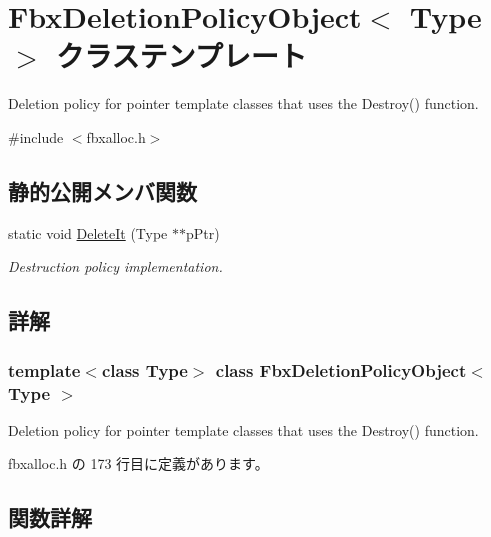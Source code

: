 \hypertarget{class_fbx_deletion_policy_object}{}\section{Fbx\+Deletion\+Policy\+Object$<$ Type $>$ クラステンプレート}
\label{class_fbx_deletion_policy_object}


Deletion policy for pointer template classes that uses the Destroy() function.  




{\ttfamily \#include $<$fbxalloc.\+h$>$}

\subsection*{静的公開メンバ関数}
\begin{DoxyCompactItemize}
\item 
static void \hyperlink{class_fbx_deletion_policy_object_a5a0e0ae55b3f3fb5f195e777facf6d1c}{Delete\+It} (Type $\ast$$\ast$p\+Ptr)
\begin{DoxyCompactList}\small\item\em Destruction policy implementation. \end{DoxyCompactList}\end{DoxyCompactItemize}


\subsection{詳解}
\subsubsection*{template$<$class Type$>$\newline
class Fbx\+Deletion\+Policy\+Object$<$ Type $>$}

Deletion policy for pointer template classes that uses the Destroy() function. 

 fbxalloc.\+h の 173 行目に定義があります。



\subsection{関数詳解}
\mbox{\label{class_fbx_deletion_policy_object_a5a0e0ae55b3f3fb5f195e777facf6d1c}} 
